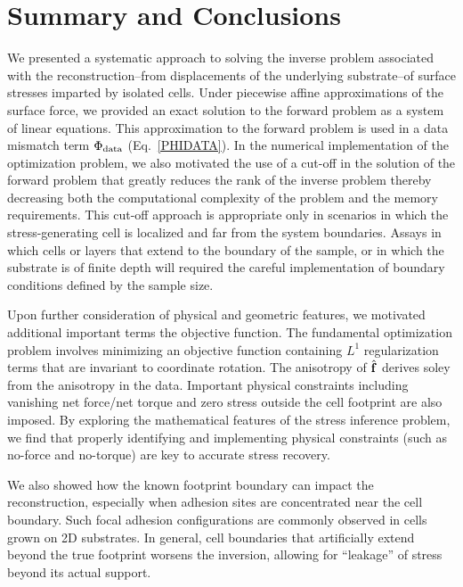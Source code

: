 \documentclass[aps,prl,reprint,twocolumn,groupedaddress,showpacs]{revtex4}
\def\f{{\bf f}}
\begin{document}
\section{Summary and Conclusions}

We presented a systematic approach to solving the inverse problem
associated with the reconstruction--from displacements of the
underlying substrate--of surface stresses imparted by isolated cells.
Under piecewise affine approximations of the surface force, we
provided an exact solution to the forward problem as a system of
linear equations. This approximation to the forward problem is used in
a data mismatch term $\Phi_{\rm data}$ (Eq.~\ref{PHIDATA}).
In the numerical implementation of the optimization problem, we also
motivated the use of a cut-off in the solution of the forward problem
that greatly reduces the rank of the inverse problem thereby
decreasing both the computational complexity of the problem and the
memory requirements. This cut-off approach is appropriate only in
scenarios in which the stress-generating cell is localized and far
from the system boundaries. Assays in which cells or layers that
extend to the boundary of the sample, or in which the substrate is of
finite depth will required the careful implementation of boundary
conditions defined by the sample size.  

Upon further consideration of physical and geometric features, 
we motivated additional important terms the objective function.   
The fundamental optimization problem involves minimizing an objective
function containing $L^{1}$ regularization terms that are invariant to
coordinate rotation. The anisotropy of $\hat{\f}$ derives soley from
the anisotropy in the data. Important physical constraints including
vanishing net force/net torque and zero stress outside the cell
footprint are also imposed. By exploring the mathematical features of
the stress inference problem, we find that properly identifying and
implementing physical constraints (such as no-force and no-torque) are
key to accurate stress recovery.

We also showed how the known footprint boundary can impact the
reconstruction, especially when adhesion sites are concentrated near
the cell boundary. Such focal adhesion configurations are commonly
observed in cells grown on 2D substrates. In general, cell boundaries
that artificially extend beyond the true footprint worsens the
inversion, allowing for ``leakage'' of stress beyond its actual
support.
\end{document}
